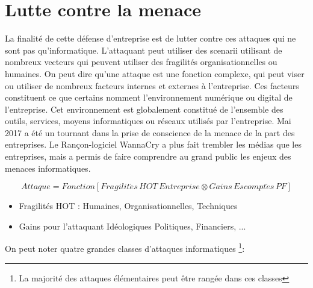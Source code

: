 \section{Lutte contre la menace}

La finalité de cette défense d’entreprise est de lutter contre ces attaques qui ne sont pas qu’informatique. L’attaquant peut utiliser des scenarii utilisant de nombreux vecteurs qui peuvent utiliser des fragilités organisationnelles ou humaines. On peut dire qu’une attaque est une fonction complexe, qui peut viser ou utiliser de nombreux facteurs internes et externes à l’entreprise. Ces facteurs constituent ce que certains nomment l’environnement numérique ou digital de l’entreprise. Cet environnement est globalement constitué de l’ensemble des outils, services, moyens informatiques ou réseaux utilisés par l’entreprise.
Mai 2017 a été un tournant dans la prise de conscience de la menace de la part des entreprises. Le Rançon-logiciel WannaCry a plus fait trembler les médias que les entreprises, mais a permis de faire comprendre au grand public les enjeux des menaces informatiques.


\begin{nota}
\begin{equation}
Attaque = Fonction \left[ Fragilit\acute{e}s\,HOT\, Entreprise\otimes Gains\,Escompt\acute{e}s\,PF \right]
\end{equation}
\end{nota}

\begin{itemize}
	\item Fragilités HOT : Humaines, Organisationnelles, Techniques 
	\item Gains pour l'attaquant Idéologiques Politiques, Financiers, ...
\end{itemize}

On peut noter quatre grandes classes d’attaques informatiques \footnote{La majorité des attaques élémentaires peut être rangée dans ces classes}:

